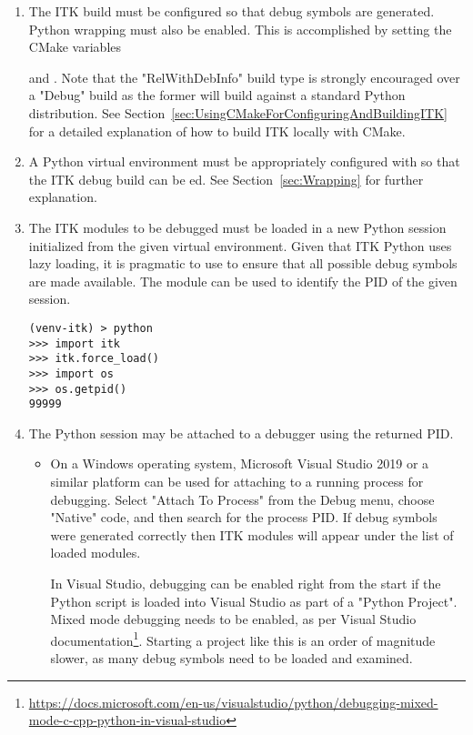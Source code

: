 \begin{enumerate}

\item The ITK build must be configured so that debug symbols
are generated. Python wrapping must also be enabled.
This is accomplished by setting the CMake variables

 and .
Note that the "RelWithDebInfo" build type is strongly encouraged over a "Debug"
build as the former will build against a standard Python distribution.
See Section~\ref{sec:UsingCMakeForConfiguringAndBuildingITK} for a detailed
explanation of how to build ITK locally with CMake.

\item A Python virtual environment must be appropriately configured with
 so that the ITK debug build can be ed.
See Section~\ref{sec:Wrapping} for further explanation.

\item The ITK modules to be debugged must be loaded in a new Python session initialized
from the given virtual environment. Given that ITK Python uses lazy loading, it is
pragmatic to use  to ensure that all possible debug symbols
are made available. The  module can be used to identify the PID of the given session.

\begin{verbatim}
(venv-itk) > python
>>> import itk
>>> itk.force_load()
>>> import os
>>> os.getpid()
99999
\end{verbatim}

\item The Python session may be attached to a debugger using the returned PID.

\begin{itemize}

\item On a Windows operating system, Microsoft Visual Studio 2019 or a similar platform
can be used for attaching to a running process for debugging. Select "Attach To Process"
from the Debug menu, choose "Native" code, and then search for the process PID. If
debug symbols were generated correctly then ITK modules will appear under the list of
loaded modules.

In Visual Studio, debugging can be enabled right from the start if the Python script
is loaded into Visual Studio as part of a "Python Project".
Mixed mode debugging needs to be enabled, as per Visual Studio
documentation\footnote{
\url{https://docs.microsoft.com/en-us/visualstudio/python/debugging-mixed-mode-c-cpp-python-in-visual-studio}}.
Starting a project like this is an order of magnitude slower, as many debug symbols need to be loaded and examined.


\end{itemize}
\end{enumerate}
